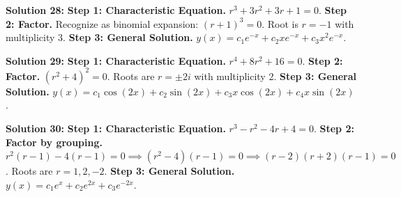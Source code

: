 \documentclass[12pt]{article}
\begin{document}
\textbf{Solution 28:}
\textbf{Step 1: Characteristic Equation.} $r^3 + 3r^2 + 3r + 1 = 0$.
\textbf{Step 2: Factor.} Recognize as binomial expansion: $(r+1)^3 = 0$.
Root is $r=-1$ with multiplicity 3.
\textbf{Step 3: General Solution.} $y(x) = c_1e^{-x} + c_2xe^{-x} + c_3x^2e^{-x}$.

\textbf{Solution 29:}
\textbf{Step 1: Characteristic Equation.} $r^4 + 8r^2 + 16 = 0$.
\textbf{Step 2: Factor.} $(r^2 + 4)^2 = 0$.
Roots are $r = \pm 2i$ with multiplicity 2.
\textbf{Step 3: General Solution.} $y(x) = c_1\cos(2x) + c_2\sin(2x) + c_3x\cos(2x) + c_4x\sin(2x)$.

\textbf{Solution 30:}
\textbf{Step 1: Characteristic Equation.} $r^3 - r^2 - 4r + 4 = 0$.
\textbf{Step 2: Factor by grouping.} $r^2(r-1) - 4(r-1) = 0 \implies (r^2-4)(r-1) = 0 \implies (r-2)(r+2)(r-1) = 0$.
Roots are $r=1, 2, -2$.
\textbf{Step 3: General Solution.} $y(x) = c_1e^x + c_2e^{2x} + c_3e^{-2x}$.

\newpage

\end{document}
